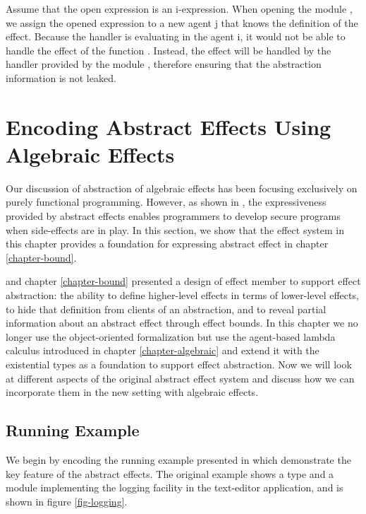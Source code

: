 Assume that the open expression is an i-expression. When opening the module , we assign the opened expression  to a new agent j that  knows the definition of the  effect. Because the  handler is evaluating in the agent i, it would not be able to handle the effect  of the function . Instead, the  effect will be handled by the handler provided by the module , therefore ensuring that the abstraction information is not leaked.



\section{Encoding Abstract Effects Using Algebraic Effects}
Our discussion of abstraction of algebraic effects has been focusing exclusively on purely functional programming. However, as shown in \citet{melicher20}, the expressiveness provided by abstract effects enables programmers to develop secure programs when side-effects are in play. In this section, we show that the effect system in this chapter provides a foundation for expressing abstract effect in chapter \ref{chapter-bound}. 

 \citet{melicher20} and chapter \ref{chapter-bound} presented a design of effect member to support effect abstraction: the ability to define higher-level effects in terms of lower-level effects, to hide that definition from clients of an abstraction, and to reveal partial information about an abstract effect through effect bounds. In this chapter we no longer use the object-oriented formalization but use the agent-based lambda calculus introduced in chapter \ref{chapter-algebraic} and extend it with the existential types as a foundation to support effect abstraction. Now we will look at different aspects of the original abstract effect system and discuss how we can incorporate them in the new setting with algebraic effects.
 
 
\subsection{Running Example}
We begin by encoding the running example presented in \citet{melicher20} which demonstrate the key feature of the abstract effects. The original example shows a type and a module implementing the logging facility in the text-editor application, and is shown in figure \ref{fig-logging}. 

